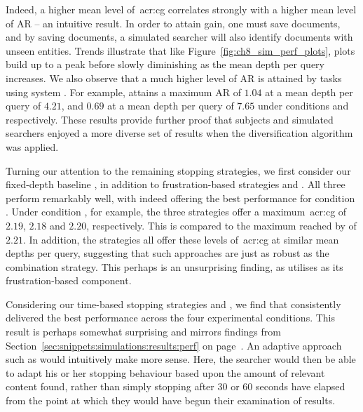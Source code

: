 Indeed, a higher mean level of~\gls{acr:cg} correlates strongly with a higher mean level of AR -- an intuitive result. In order to attain gain, one must save documents, and by saving documents, a simulated searcher will also identify documents with unseen entities. Trends illustrate that like Figure~\ref{fig:ch8_sim_perf_plots}, plots build up to a peak before slowly diminishing as the mean depth per query increases. We also observe that a much higher level of AR is attained by tasks using system . For example,  attains a maximum AR of $1.04$ at a mean depth per query of $4.21$, and $0.69$ at a mean depth per query of $7.65$ under conditions  and  respectively. These results provide further proof that subjects and simulated searchers enjoyed a more diverse set of results when the diversification algorithm was applied.

Turning our attention to the remaining stopping strategies, we first consider our fixed-depth baseline , in addition to frustration-based strategies  and . All three perform remarkably well, with  indeed offering the best performance for condition . Under condition , for example, the three strategies offer a maximum~\gls{acr:cg} of $2.19$, $2.18$ and $2.20$, respectively. This is compared to the maximum reached by  of $2.21$. In addition, the strategies all offer these levels of~\gls{acr:cg} at similar mean depths per query, suggesting that such approaches are just as robust as the combination strategy. This perhaps is an unsurprising finding, as  utilises  as its frustration-based component.

Considering our time-based stopping strategies  and , we find that  consistently delivered the best performance across the four experimental conditions. This result is perhaps somewhat surprising and mirrors findings from Section~\ref{sec:snippets:simulations:results:perf} on page~\pageref{sec:snippets:simulations:results:perf}. An adaptive approach such as  would intuitively make more sense. Here, the searcher would then be able to adapt his or her stopping behaviour based upon the amount of relevant content found, rather than simply stopping after $30$ or $60$ seconds have elapsed from the point at which they would have begun their examination of results.

